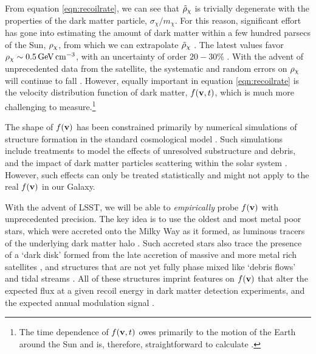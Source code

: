 From equation \ref{eqn:recoilrate}, we can see that $\tilde{\rho}_\mathrm{\chi}$ is trivially degenerate with the properties of the dark matter particle, $\sigma_\chi/m_\chi$. For this reason, significant effort has gone into estimating the amount of dark matter within a few hundred parsecs of the Sun, $\rho_\mathrm{\chi}$, from which we can extrapolate $\tilde{\rho}_\mathrm{\chi}$ \citep[see][for a review]{1404.1938}. The latest values favor $\rho_\mathrm{\chi} \sim 0.5\mathrm{\,GeV} \mathrm{\,cm}^{-3}$, with an uncertainty of order $20-30$\% \citep[\eg,][]{2014A&A...571A..92B,2018MNRAS.478.1677S}. With the advent of unprecedented data from the \Gaia satellite, the systematic and random errors on $\rho_\mathrm{\chi}$ will continue to fall \citep{1404.1938}. However, equally important in equation \ref{eqn:recoilrate} is the velocity distribution function of dark matter, $f({\bf v},t)$, which is much more challenging to measure.\footnote{The time dependence of $f({\bf v},t)$ owes primarily to the motion of the Earth around the Sun and is, therefore, straightforward to calculate \citep[\eg,][]{1986PhRvD..33.3495D}.}

The shape of $f({\bf v})$ has been constrained primarily by numerical simulations of structure formation in the standard cosmological model \citep[\eg,][]{2009MNRAS.395..797V,1210.2721}. Such simulations include treatments to model the effects of unresolved substructure and debris, and the impact of dark matter particles scattering within the solar system \citep[\eg,][]{2009PhRvD..79j3531P}. However, such effects can only be treated statistically and might not apply to the real $f({\bf v})$ in our Galaxy.

With the advent of LSST, we will be able to {\it empirically} probe $f({\bf v})$ with unprecedented precision. The key idea is to use the oldest and most metal poor stars, which were accreted onto the Milky Way as it formed, as luminous tracers of the underlying dark matter halo \citep{Lisanti:2011as,Kuhlen:2012fz,2014MNRAS.445L..21T,Lisanti:2014dva,2018PhRvL.120d1102H,Necib:2018b}. Such accreted stars also trace the presence of a `dark disk' formed from the late accretion of massive and more metal rich satellites \citep{1989AJ.....98.1554L,2008MNRAS.389.1041R,2009MNRAS.397...44R,2014MNRAS.444..515R,2015MNRAS.450.2874R}, and structures that are not yet fully phase mixed like `debris flows' \citep[\eg,][]{Lisanti:2011as,2018MNRAS.477.1472B,2018Natur.563...85H,necib2018} and tidal streams \citep[\eg,][]{2005PhRvD..71d3516F,1807.09004}. All of these structures imprint features on $f({\bf v})$ that alter the expected flux at a given recoil energy in dark matter detection experiments, and the expected annual modulation signal \citep[\eg,][]{2005PhRvD..71d3516F,2009ApJ...696..920B,2018arXiv181011468E}.

